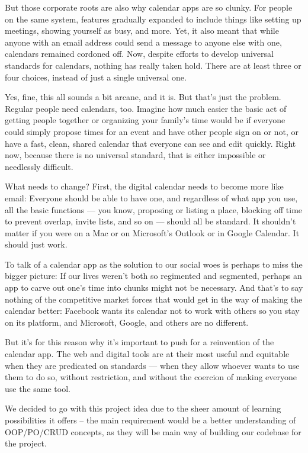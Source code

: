 But those corporate roots are also why calendar apps are so clunky. For people on the same system, features gradually expanded to include things like setting up meetings, showing yourself as busy, and more. Yet, it also meant that while anyone with an email address could send a message to anyone else with one, calendars remained cordoned off. Now, despite efforts to develop universal standards for calendars, nothing has really taken hold. There are at least three or four choices, instead of just a single universal one. 

Yes, fine, this all sounds a bit arcane, and it is. But that's just the problem. Regular people need calendars, too. Imagine how much easier the basic act of getting people together or organizing your family's time would be if everyone could simply propose times for an event and have other people sign on or not, or have a fast, clean, shared calendar that everyone can see and edit quickly. Right now, because there is no universal standard, that is either impossible or needlessly difficult. 

What needs to change? First, the digital calendar needs to become more like email: Everyone should be able to have one, and regardless of what app you use, all the basic functions — you know, proposing or listing a place, blocking off time to prevent overlap, invite lists, and so on — should all be standard. It shouldn't matter if you were on a Mac or on Microsoft's Outlook or in Google Calendar. It should just work. 

To talk of a calendar app as the solution to our social woes is perhaps to miss the bigger picture: If our lives weren't both so regimented and segmented, perhaps an app to carve out one's time into chunks might not be necessary. And that's to say nothing of the competitive market forces that would get in the way of making the calendar better: Facebook wants its calendar not to work with others so you stay on its platform, and Microsoft, Google, and others are no different. 

But it's for this reason why it's important to push for a reinvention of the calendar app. The web and digital tools are at their most useful and equitable when they are predicated on standards — when they allow whoever wants to use them to do so, without restriction, and without the coercion of making everyone use the same tool. 



We decided to go with this project idea due to the sheer amount of learning possibilities it offers – the main requirement would be a better understanding of OOP/PO/CRUD concepts, as they will be main way of building our codebase for the project.  

